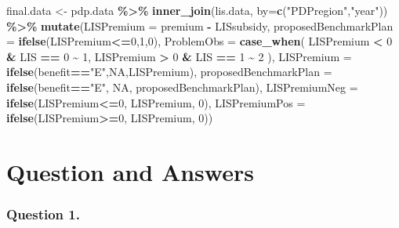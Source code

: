 \documentclass[
  12pt,
]{article}
\newenvironment{Shaded}{\begin{snugshade}}{\end{snugshade}}
\newcommand{\DataTypeTok}[1]{\textcolor[rgb]{0.13,0.29,0.53}{#1}}
\newcommand{\DecValTok}[1]{\textcolor[rgb]{0.00,0.00,0.81}{#1}}
\newcommand{\KeywordTok}[1]{\textcolor[rgb]{0.13,0.29,0.53}{\textbf{#1}}}
\newcommand{\NormalTok}[1]{#1}
\newcommand{\OperatorTok}[1]{\textcolor[rgb]{0.81,0.36,0.00}{\textbf{#1}}}
\newcommand{\OtherTok}[1]{\textcolor[rgb]{0.56,0.35,0.01}{#1}}
\newcommand{\StringTok}[1]{\textcolor[rgb]{0.31,0.60,0.02}{#1}}
\begin{document}
\begin{Shaded}
\begin{Highlighting}[]
\NormalTok{final.data \textless{}{-}}\StringTok{ }\NormalTok{pdp.data }\OperatorTok{\%\textgreater{}\%}
\StringTok{  }\KeywordTok{inner\_join}\NormalTok{(lis.data, }\DataTypeTok{by=}\KeywordTok{c}\NormalTok{(}\StringTok{"PDPregion"}\NormalTok{,}\StringTok{"year"}\NormalTok{)) }\OperatorTok{\%\textgreater{}\%}
\StringTok{  }\KeywordTok{mutate}\NormalTok{(}\DataTypeTok{LISPremium =}\NormalTok{ premium }\OperatorTok{{-}}\StringTok{ }\NormalTok{LISsubsidy,}
         \DataTypeTok{proposedBenchmarkPlan =} \KeywordTok{ifelse}\NormalTok{(LISPremium}\OperatorTok{\textless{}=}\DecValTok{0}\NormalTok{,}\DecValTok{1}\NormalTok{,}\DecValTok{0}\NormalTok{),}
         \DataTypeTok{ProblemObs =} \KeywordTok{case\_when}\NormalTok{(}
\NormalTok{           LISPremium }\OperatorTok{\textless{}}\StringTok{ }\DecValTok{0} \OperatorTok{\&}\StringTok{ }\NormalTok{LIS }\OperatorTok{==}\StringTok{ }\DecValTok{0} \OperatorTok{\textasciitilde{}}\StringTok{ }\DecValTok{1}\NormalTok{,}
\NormalTok{           LISPremium }\OperatorTok{\textgreater{}}\StringTok{ }\DecValTok{0} \OperatorTok{\&}\StringTok{ }\NormalTok{LIS }\OperatorTok{==}\StringTok{ }\DecValTok{1} \OperatorTok{\textasciitilde{}}\StringTok{ }\DecValTok{2}
\NormalTok{         ),}
         \DataTypeTok{LISPremium =} \KeywordTok{ifelse}\NormalTok{(benefit}\OperatorTok{==}\StringTok{"E"}\NormalTok{,}\OtherTok{NA}\NormalTok{,LISPremium),}
         \DataTypeTok{proposedBenchmarkPlan =} \KeywordTok{ifelse}\NormalTok{(benefit}\OperatorTok{==}\StringTok{"E"}\NormalTok{, }\OtherTok{NA}\NormalTok{, proposedBenchmarkPlan),}
         \DataTypeTok{LISPremiumNeg =} \KeywordTok{ifelse}\NormalTok{(LISPremium}\OperatorTok{\textless{}=}\DecValTok{0}\NormalTok{, LISPremium, }\DecValTok{0}\NormalTok{),}
         \DataTypeTok{LISPremiumPos =} \KeywordTok{ifelse}\NormalTok{(LISPremium}\OperatorTok{\textgreater{}=}\DecValTok{0}\NormalTok{, LISPremium, }\DecValTok{0}\NormalTok{))}
\end{Highlighting}
\end{Shaded}


\hypertarget{question-and-answers}{%
\section{Question and Answers}\label{question-and-answers}}

\hypertarget{question-1.}{%
\subsubsection{Question 1.}\label{question-1.}}
\end{document}
